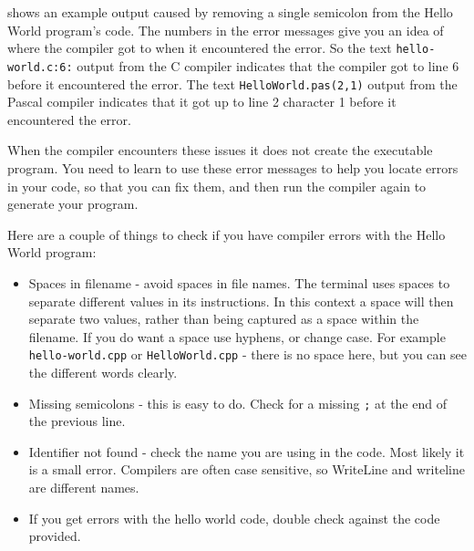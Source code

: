  shows an example output caused by removing a single semicolon from the Hello World program's code. The numbers in the error messages give you an idea of where the compiler got to when it encountered the error. So the text \texttt{hello-world.c:6:} output from the C compiler indicates that the compiler got to line 6 before it encountered the error. The text \texttt{HelloWorld.pas(2,1)} output from the Pascal compiler indicates that it got up to line 2 character 1 before it encountered the error.

When the compiler encounters these issues it does not create the executable program. You need to learn to use these error messages to help you locate errors in your code, so that you can fix them, and then run the compiler again to generate your program.


Here are a couple of things to check if you have compiler errors with the Hello World program:

\begin{itemize}
   \item Spaces in filename - avoid spaces in file names. The terminal uses spaces to separate different values in its instructions. In this context a space will then separate two values, rather than being captured as a space within the filename. If you do want a space use hyphens, or change case. For example \texttt{hello-world.cpp} or \texttt{HelloWorld.cpp} - there is no space here, but you can see the different words clearly.
   \item Missing semicolons - this is easy to do. Check for a missing \texttt{;} at the end of the previous line.
   \item Identifier not found - check the name you are using in the code. Most likely it is a small error. Compilers are often case sensitive, so WriteLine and writeline are different names.
   \item If you get errors with the hello world code, double check against the code provided.
\end{itemize}





